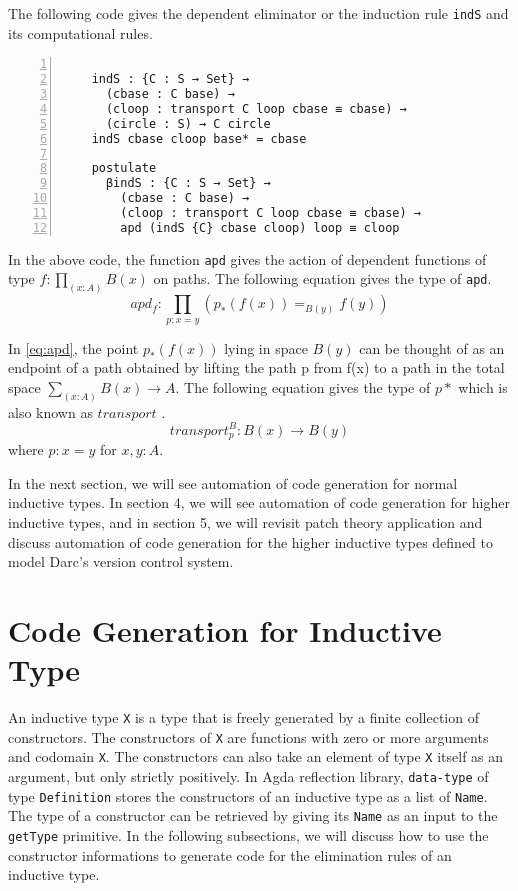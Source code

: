 \documentclass[sigplan,10pt]{acmart}
\begin{document}
The following code gives the dependent eliminator or the induction rule {\tt indS} and its computational rules.
 
\begin{center}
\begingroup
\fontsize{7pt}{9pt}\selectfont
\begin{Verbatim}[frame = lines, rulecolor=\color{blue}, numbers = left, numbersep = 0pt]
 
    indS : {C : S → Set} → 
      (cbase : C base) → 
      (cloop : transport C loop cbase ≡ cbase) → 
      (circle : S) → C circle
    indS cbase cloop base* = cbase

    postulate
      βindS : {C : S → Set} → 
        (cbase : C base) →
        (cloop : transport C loop cbase ≡ cbase) → 
        apd (indS {C} cbase cloop) loop ≡ cloop

\end{Verbatim}
\endgroup
\end{center}

\normalsize
In the above code, the function {\tt apd} gives the action of dependent functions of type $f : \prod_{(x:A)}B(x)$ on paths. The following equation gives the type of {\tt apd}.
\begin{equation} \label{eq:apd}
	apd_f : \prod_{p:x=y} (p_*(f(x)) =_{B(y)} f(y))
\end{equation}
 
In \eqref{eq:apd}, the point $p_*(f(x))$ lying in space $B(y)$ can be thought of as an endpoint of a path obtained by lifting the path p from f(x) to a path in the total space $\sum_{(x:A)} B(x) \rightarrow A$. The following equation gives the type of $p*$ which is also known as $transport$ \cite{HoTT-2013}.
\begin{equation} \label{eq:transport}
	transport^B_p : B(x) \rightarrow B(y)
\end{equation}
where $p : x = y$ for $x,y : A$.

In the next section, we will see automation of code generation for normal inductive types. In section 4, we will see automation of code generation for higher inductive types, and in section 5, we will revisit patch theory \citep{Angiuli-2014} application and discuss automation of code generation for the higher inductive types defined to model Darc's version control system.

\section{Code Generation for Inductive Type}
\label{sec:sec3}
An inductive type {\tt X} is a type that is freely generated by a finite collection of constructors. The constructors of {\tt X} are functions with zero or more arguments and codomain {\tt X}. The constructors can also take an element of type {\tt X} itself as an argument, but only strictly positively. In Agda reflection library, {\tt data-type} of type {\tt Definition} stores the constructors of an inductive type as a list of {\tt Name}. The type of a constructor can be retrieved by giving its {\tt Name} as an input to the {\tt getType} primitive. In the following subsections, we will discuss how to use the constructor informations to generate code for the elimination rules of an inductive type. 
\end{document}
